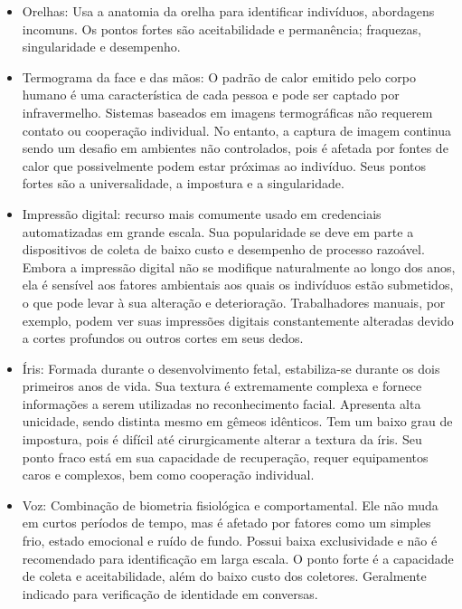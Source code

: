 \begin{itemize}
    \item Orelhas: Usa a anatomia da orelha para identificar indivíduos, abordagens 
    incomuns. Os pontos fortes são aceitabilidade e permanência; fraquezas, 
    singularidade e desempenho.

    \item Termograma da face e das mãos: O padrão de calor emitido pelo corpo 
    humano é uma característica de cada pessoa e pode ser captado por 
    infravermelho. Sistemas baseados em imagens termográficas não requerem 
    contato ou cooperação individual. No entanto, a captura de imagem continua 
    sendo um desafio em ambientes não controlados, pois é afetada por fontes de 
    calor que possivelmente podem estar próximas ao indivíduo. Seus pontos fortes 
    são a universalidade, a impostura e a singularidade.

    \item Impressão digital: recurso mais comumente usado em credenciais 
     automatizadas em grande escala.  Sua popularidade se deve em parte a 
     dispositivos de coleta de baixo custo e desempenho de processo razoável. 
     Embora a impressão digital não se modifique naturalmente ao longo dos anos, 
     ela é sensível aos fatores ambientais aos quais os indivíduos estão 
     submetidos, o que pode levar à sua alteração e deterioração. Trabalhadores 
     manuais, por exemplo, podem ver suas impressões digitais constantemente 
     alteradas devido a cortes profundos ou outros cortes em seus dedos.

    \item Íris: Formada durante o desenvolvimento fetal, estabiliza-se durante 
    os dois primeiros anos de vida. Sua textura é extremamente complexa e 
    fornece informações a serem utilizadas no reconhecimento facial. Apresenta 
    alta unicidade, sendo distinta mesmo em gêmeos idênticos. Tem um baixo grau 
    de impostura, pois é difícil até cirurgicamente alterar a textura da íris. 
    Seu ponto fraco está em sua capacidade de recuperação, requer equipamentos 
    caros e complexos, bem como cooperação individual.

    \item Voz: Combinação de biometria fisiológica e comportamental. Ele não muda 
    em curtos períodos de tempo, mas é afetado por fatores como um simples frio, 
    estado emocional e ruído de fundo. Possui baixa exclusividade e não é 
    recomendado para identificação em larga escala. O ponto forte é a capacidade 
    de coleta e aceitabilidade, além do baixo custo dos coletores. Geralmente 
    indicado para verificação de identidade em conversas.
\end{itemize}

